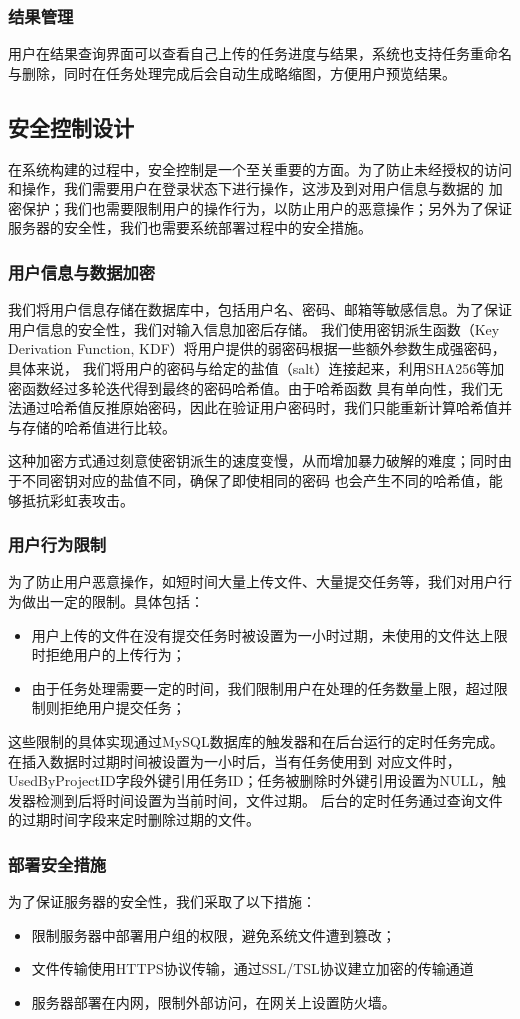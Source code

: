 \subsubsection{结果管理}

用户在结果查询界面可以查看自己上传的任务进度与结果，系统也支持任务重命名与删除，同时在任务处理完成后会自动生成略缩图，方便用户预览结果。

\subsection{安全控制设计}

在系统构建的过程中，安全控制是一个至关重要的方面。为了防止未经授权的访问和操作，我们需要用户在登录状态下进行操作，这涉及到对用户信息与数据的
加密保护；我们也需要限制用户的操作行为，以防止用户的恶意操作；另外为了保证服务器的安全性，我们也需要系统部署过程中的安全措施。

\subsubsection{用户信息与数据加密}

我们将用户信息存储在数据库中，包括用户名、密码、邮箱等敏感信息。为了保证用户信息的安全性，我们对输入信息加密后存储。
我们使用密钥派生函数（Key Derivation Function, KDF）将用户提供的弱密码根据一些额外参数生成强密码，具体来说，
我们将用户的密码与给定的盐值（salt）连接起来，利用SHA256等加密函数经过多轮迭代得到最终的密码哈希值。由于哈希函数
具有单向性，我们无法通过哈希值反推原始密码，因此在验证用户密码时，我们只能重新计算哈希值并与存储的哈希值进行比较。

这种加密方式通过刻意使密钥派生的速度变慢，从而增加暴力破解的难度；同时由于不同密钥对应的盐值不同，确保了即使相同的密码
也会产生不同的哈希值，能够抵抗彩虹表攻击。

\subsubsection{用户行为限制}

为了防止用户恶意操作，如短时间大量上传文件、大量提交任务等，我们对用户行为做出一定的限制。具体包括：
\begin{itemize}
    \item 用户上传的文件在没有提交任务时被设置为一小时过期，未使用的文件达上限时拒绝用户的上传行为；
    \item 由于任务处理需要一定的时间，我们限制用户在处理的任务数量上限，超过限制则拒绝用户提交任务；
\end{itemize}
这些限制的具体实现通过MySQL数据库的触发器和在后台运行的定时任务完成。在插入数据时过期时间被设置为一小时后，当有任务使用到
对应文件时，UsedByProjectID字段外键引用任务ID；任务被删除时外键引用设置为NULL，触发器检测到后将时间设置为当前时间，文件过期。
后台的定时任务通过查询文件的过期时间字段来定时删除过期的文件。

\subsubsection{部署安全措施}

为了保证服务器的安全性，我们采取了以下措施：
\begin{itemize}
    \item 限制服务器中部署用户组的权限，避免系统文件遭到篡改；
    \item 文件传输使用HTTPS协议传输，通过SSL/TSL协议建立加密的传输通道
    \item 服务器部署在内网，限制外部访问，在网关上设置防火墙。
\end{itemize}